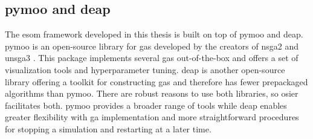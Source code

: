 \subsection{\acs{pymoo} and \acs{deap}}

The \ac{esom} framework developed in this thesis is built on top of \ac{pymoo}
and \ac{deap}. \ac{pymoo} is an open-source library for \acp{ga} developed by
the creators of \ac{nsga2} and \ac{unsga3} \cite{blank_pymoo_2020}. This package
implements several \acp{ga} out-of-the-box and offers a set of visualization
tools and hyperparameter tuning. \ac{deap} is another open-source library
offering a toolkit for constructing \acp{ga} and therefore has fewer prepackaged
algorithms than \ac{pymoo}. There are robust reasons to use both libraries, so
\ac{osier} facilitates both. \ac{pymoo} provides a broader range of tools 
while \ac{deap} enables greater flexibility with \ac{ga} implementation and more
straightforward procedures for stopping a simulation and restarting at a later
time.





